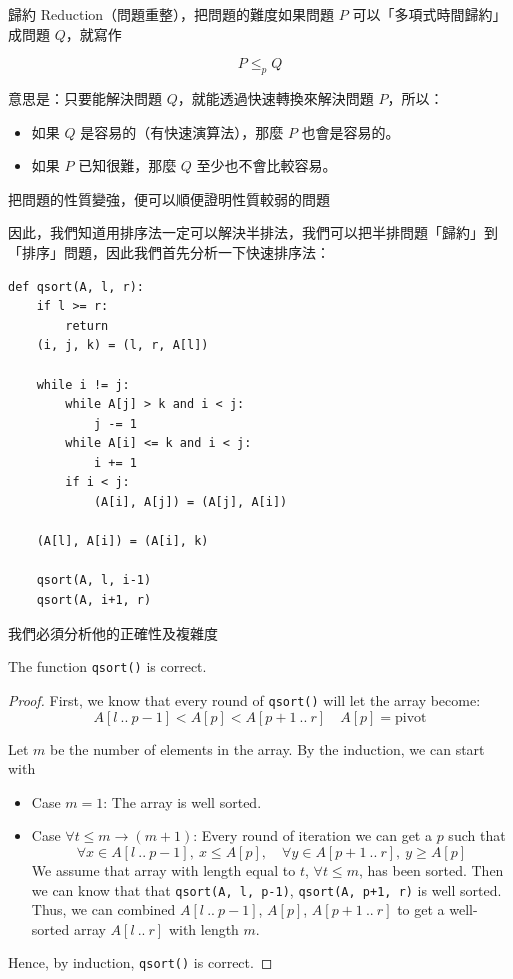 \begin{theorem}
歸約 Reduction（問題重整），把問題的難度如果問題 $P$ 可以「多項式時間歸約」成問題 $Q$，就寫作

\[
    P \leq_p Q
\]

意思是：只要能解決問題 $Q$，就能透過快速轉換來解決問題 $P$，所以：
\begin{itemize}
    \item 如果 $Q$ 是容易的（有快速演算法），那麼 $P$ 也會是容易的。
    \item 如果 $P$ 已知很難，那麼 $Q$ 至少也不會比較容易。
\end{itemize}
\end{theorem}

\begin{note}
把問題的性質變強，便可以順便證明性質較弱的問題
\end{note}

\newpage


因此，我們知道用排序法一定可以解決半排法，我們可以把半排問題「歸約」到「排序」問題，因此我們首先分析一下快速排序法：


\begin{lstlisting}[language=iPython, caption=Quicksort in Python, xleftmargin=0.05\textwidth]
def qsort(A, l, r):
    if l >= r:
        return
    (i, j, k) = (l, r, A[l])

    while i != j:
        while A[j] > k and i < j:
            j -= 1
        while A[i] <= k and i < j:
            i += 1
        if i < j:
            (A[i], A[j]) = (A[j], A[i])

    (A[l], A[i]) = (A[i], k)

    qsort(A, l, i-1)
    qsort(A, i+1, r)
\end{lstlisting}

我們必須分析他的正確性及複雜度

\begin{theorem}
    The function \texttt{qsort()} is correct.
\end{theorem}
\begin{proof}
    First, we know that every round of \texttt{qsort()} will let the array become:
    \[
    A[l\ ..\ p-1] < A[p] < A[p+1\ .. \ r] \quad A[p] = \text{pivot}
    \]

    Let $m$ be the number of elements in the array. By the induction, we can start with
    \begin{itemize}
        \item Case $m=1$: The array is well sorted.
        \item Case $\forall t \leq m \rightarrow (m+1)$: Every round of iteration we can get a $p$ such that \[
            \forall x \in A[l \ .. \ p-1],\ x \leq A[p], \quad \forall y \in A[p+1 \ .. \ r],\ y \geq A[p]
        \]
        We assume that array with length equal to $t$, $\forall t \leq m$, has been sorted. Then we can know that that \texttt{qsort(A, l, p-1)}, \texttt{qsort(A, p+1, r)} is well sorted. Thus, we can combined $A[l \ .. \ p-1]$, $A[p]$, $A[p+1 \ .. \ r]$ to get a well-sorted array $A[l \ .. \ r]$ with length $m$.
    \end{itemize}
    Hence, by induction, \texttt{qsort()} is correct.
\end{proof}

